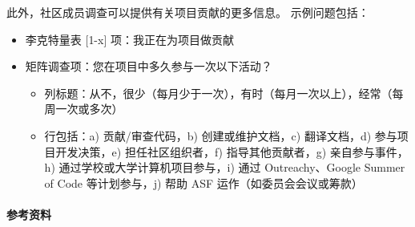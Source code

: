 此外，社区成员调查可以提供有关项目贡献的更多信息。 示例问题包括：

\begin{itemize}
\tightlist
\item
  李克特量表 {[}1-x{]} 项：我正在为项目做贡献
\item
  矩阵调查项：您在项目中多久参与一次以下活动？

  \begin{itemize}
  \tightlist
  \item
    列标题：从不，很少（每月少于一次），有时（每月一次以上），经常（每周一次或多次）
  \item
    行包括：a) 贡献/审查代码，b) 创建或维护文档，c) 翻译文档，d)
    参与项目开发决策，e) 担任社区组织者，f) 指导其他贡献者，g)
    亲自参与事件，h) 通过学校或大学计算机项目参与，i) 通过
    Outreachy、Google Summer of Code 等计划参与，j) 帮助 ASF
    运作（如委员会会议或筹款）
  \end{itemize}
\end{itemize}

\hypertarget{ux53c2ux8003ux8d44ux6599}{%
\paragraph{参考资料}\label{ux53c2ux8003ux8d44ux6599}}

